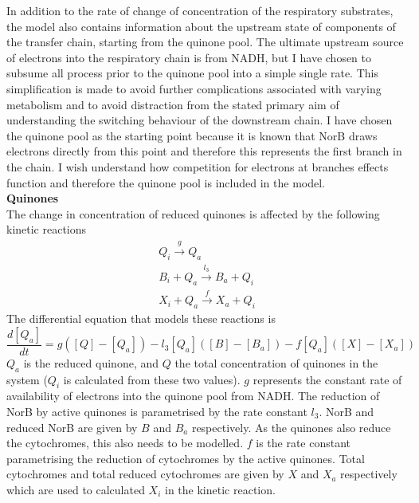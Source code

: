 In addition to the rate of change of concentration of the respiratory substrates, the model also contains information about the upstream state of components of the transfer chain, starting from the quinone pool. The ultimate upstream source of electrons into the respiratory chain is from NADH, but I have chosen to subsume all process prior to the quinone pool into a simple single rate. This simplification is made to avoid further complications associated with varying metabolism and to avoid distraction from the stated primary aim of understanding the switching behaviour of the downstream chain. I have chosen the quinone pool as the starting point because it is known that NorB draws electrons directly from this point and therefore this represents the first branch in the chain. I wish understand how competition for electrons at branches effects function and therefore the quinone pool is included in the model.\\
{\bf Quinones}\\
The change in concentration of reduced quinones is affected by the following kinetic reactions
\begin{equation*}
\begin{gathered}
Q_i \xrightarrow{g} Q_a\\
B_i + Q_a \xrightarrow{l_3} B_a + Q_i\\
X_i + Q_a \xrightarrow{f} X_a + Q_i
\end{gathered}
\end{equation*}
The differential equation that models these reactions is
\begin{equation}
\frac{d[Q_a]}{dt} = g([Q] - [Q_a]) - l_3[Q_a]([B] - [B_a]) - f[Q_a]([X]-[X_a])
\label{eq:quinones}
\end{equation}
$Q_a$ is the reduced quinone, and $Q$ the total concentration of quinones in the system ($Q_i$ is calculated from these two values). $g$ represents the constant rate of availability of electrons into the quinone pool from NADH. The reduction of NorB by active quinones is parametrised by the rate constant $l_3$. NorB and reduced NorB are given by $B$ and $B_a$ respectively. As the quinones also reduce the cytochromes, this also needs to be modelled. $f$ is the rate constant parametrising the reduction of cytochromes by the active quinones. Total cytochromes and total reduced cytochromes are given by $X$ and $X_a$ respectively which are used to calculated $X_i$ in the kinetic reaction.\\
